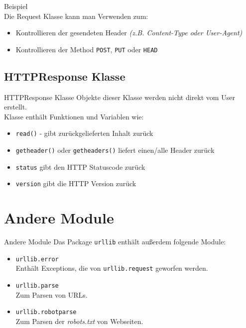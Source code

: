 \begin{frame}{Beispiel}
	 \ \\[.5cm]
	Die Request Klasse kann man Verwenden zum:
	\begin{itemize}
		\item Kontrollieren der gesendeten Header \textit{(z.B. Content-Type oder User-Agent)}
		\item Kontrollieren der Method \texttt{POST}, \texttt{PUT} oder \texttt{HEAD}
	\end{itemize}
\end{frame}

\subsection{HTTPResponse Klasse}
\begin{frame}[fragile]{HTTPResponse Klasse}
	Objekte dieser Klasse werden nicht direkt vom User erstellt.
	 \ \\[.5cm]
	Klasse enthält Funktionen und Variablen wie:
	\begin{itemize}
		\item \texttt{read()} - gibt zurückgelieferten Inhalt zurück
		\item \texttt{getheader()} oder \texttt{getheaders()} liefert einen/alle Header zurück
		\item \texttt{status} gibt den HTTP Statuscode zurück
		\item \texttt{version} gibt die HTTP Version zurück
	\end{itemize}
\end{frame}


\section{Andere Module}
\begin{frame}[fragile]{Andere Module}
	Das Package \alert{\texttt{urllib}} enthält au{\ss}erdem folgende Module:
	\begin{itemize}
		\item \texttt{urllib.error} \ \\
			Enthält Exceptions, die von \texttt{urllib.request} geworfen werden.
		\item \texttt{urllib.parse} \ \\
			Zum Parsen von URLs.
		\item \texttt{urllib.robotparse} \ \\
			Zum Parsen der \textit{robots.txt} von Webseiten.
	\end{itemize}
\end{frame}


